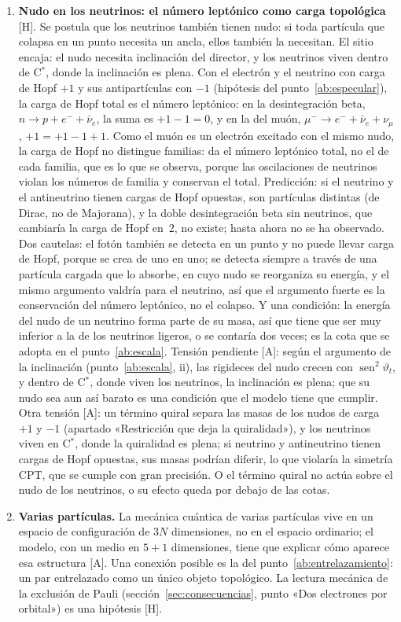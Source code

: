 \documentclass[11pt,a4paper]{article}
\newcommand{\st}[1]{\textup{[#1]}}
\newcommand{\Cst}{C\ensuremath{^{*}}}
\begin{document}
\begin{enumerate}[label=\arabic*.,ref=\arabic*,leftmargin=*]
\item \label{ab:leptonico}\textbf{Nudo en los neutrinos: el número leptónico como carga topológica} \st{H}. Se postula que los neutrinos también tienen nudo: si toda partícula que colapsa en un punto necesita un ancla, ellos también la necesitan. El sitio encaja: el nudo necesita inclinación del director, y los neutrinos viven dentro de \Cst, donde la inclinación es plena. Con el electrón y el neutrino con carga de Hopf $+1$ y sus antipartículas con $-1$ (hipótesis del punto~\ref{ab:especular}), la carga de Hopf total es el número leptónico: en la desintegración beta, $n\to p+e^-+\bar\nu_e$, la suma es $+1-1=0$, y en la del muón, $\mu^-\to e^-+\bar\nu_e+\nu_\mu$, $+1=+1-1+1$. Como el muón es un electrón excitado con el mismo nudo, la carga de Hopf no distingue familias: da el número leptónico total, no el de cada familia, que es lo que se observa, porque las oscilaciones de neutrinos violan los números de familia y conservan el total. Predicción: si el neutrino y el antineutrino tienen cargas de Hopf opuestas, son partículas distintas (de Dirac, no de Majorana), y la doble desintegración beta sin neutrinos, que cambiaría la carga de Hopf en~2, no existe; hasta ahora no se ha observado. Dos cautelas: el fotón también se detecta en un punto y no puede llevar carga de Hopf, porque se crea de uno en uno; se detecta siempre a través de una partícula cargada que lo absorbe, en cuyo nudo se reorganiza su energía, y el mismo argumento valdría para el neutrino, así que el argumento fuerte es la conservación del número leptónico, no el colapso. Y una condición: la energía del nudo de un neutrino forma parte de su masa, así que tiene que ser muy inferior a la de los neutrinos ligeros, o se contaría dos veces; es la cota que se adopta en el punto~\ref{ab:escala}. Tensión pendiente \st{A}: según el argumento de la inclinación (punto~\ref{ab:escala}, ii), las rigideces del nudo crecen con $\operatorname{sen}^2\vartheta_t$, y dentro de \Cst, donde viven los neutrinos, la inclinación es plena; que su nudo sea aun así barato es una condición que el modelo tiene que cumplir. Otra tensión \st{A}: un término quiral separa las masas de los nudos de carga $+1$ y $-1$ (apartado «Restricción que deja la quiralidad»), y los neutrinos viven en \Cst, donde la quiralidad es plena; si neutrino y antineutrino tienen cargas de Hopf opuestas, sus masas podrían diferir, lo que violaría la simetría CPT, que se cumple con gran precisión. O el término quiral no actúa sobre el nudo de los neutrinos, o su efecto queda por debajo de las cotas.
\item \label{ab:configuracion}\textbf{Varias partículas.} La mecánica cuántica de varias partículas vive en un espacio de configuración de $3N$ dimensiones, no en el espacio ordinario; el modelo, con un medio en $5+1$ dimensiones, tiene que explicar cómo aparece esa estructura \st{A}. Una conexión posible es la del punto~\ref{ab:entrelazamiento}: un par entrelazado como un único objeto topológico. La lectura mecánica de la exclusión de Pauli (sección~\ref{sec:consecuencias}, punto «Dos electrones por orbital») es una hipótesis \st{H}.
\end{enumerate}
\end{document}
